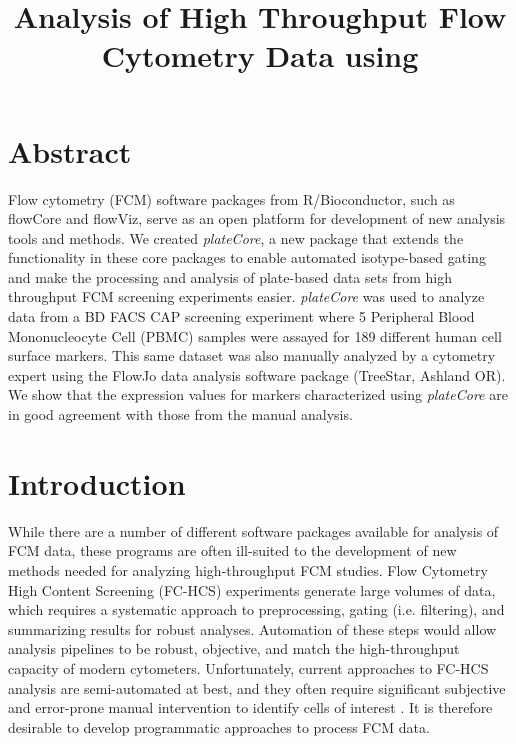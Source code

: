 \documentclass[12pt]{article}
\title{Analysis of High Throughput Flow Cytometry Data using
\Rpackage{plateCore}}
\newcommand{\Rpackage}[1]{{\textit{#1}}}
\begin{document}
\maketitle

\clearpage
\section*{Abstract}
Flow cytometry (FCM) software packages from R/Bioconductor, such as flowCore
and flowViz, serve as an open platform for development of new analysis tools and
methods. We created \Rpackage{plateCore}, a new package that extends the
functionality in these core packages to enable automated isotype-based gating
and make the processing and analysis of plate-based data sets from
high throughput FCM screening experiments easier. \Rpackage{plateCore} was used
to analyze data from a BD FACS CAP screening experiment where 5 Peripheral Blood
Mononucleocyte Cell (PBMC) samples  were assayed for 189 different human cell
surface markers. This same dataset was also manually analyzed by a cytometry
expert using the FlowJo data analysis software package (TreeStar, Ashland OR).
We show that the expression values for markers characterized using
\Rpackage{plateCore} are in good agreement with those from the manual analysis.


\clearpage
\section*{Introduction}

While there are a number of different software packages available for analysis
of FCM data, these programs are often ill-suited to the development of new
methods needed for analyzing high-throughput FCM studies. Flow Cytometry High
Content Screening (FC-HCS) experiments generate large volumes of data,
which requires a systematic approach to preprocessing, gating (i.e. filtering),
and summarizing results for robust analyses. Automation of these steps would
allow analysis pipelines to be robust, objective, and match the high-throughput
capacity of modern cytometers. Unfortunately, current approaches to FC-HCS
analysis are semi-automated at best, and they often require significant
subjective and error-prone manual intervention to identify cells of interest
\citep{Maecker2005}. It is therefore desirable to develop programmatic
approaches to process FCM data.
\end{document}
